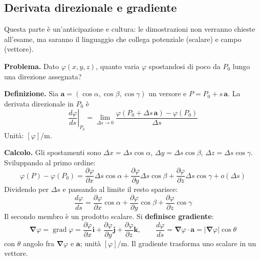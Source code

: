 \documentclass[11pt,a4paper]{article}
\newcommand{\vv}[1]{\mathbf{#1}}
\newcommand{\pd}[2]{\dfrac{\partial #1}{\partial #2}}
\newcommand{\mo}[1]{\left|#1\right|}
\DeclareMathOperator{\grad}{grad}
\newcommand{\nab}{\boldsymbol{\nabla}}
\begin{document}
\subsection{Derivata direzionale e gradiente}\label{sec:derdir}
\begin{nota}
Questa parte è un'anticipazione e \guillemotleft cultura\guillemotright: le dimostrazioni non verranno chieste all'esame, ma saranno il linguaggio che collega potenziale (scalare) e campo (vettore).
\end{nota}

\textbf{Problema.} Dato $\varphi(x,y,z)$, quanto varia $\varphi$ spostandosi di poco da $P_0$ lungo una direzione assegnata?

\textbf{Definizione.} Sia $\vv a=(\cos\alpha,\cos\beta,\cos\gamma)$ un versore e $P=P_0+s\,\vv a$. La derivata direzionale in $P_0$ è
\begin{equation}
\left.\frac{d\varphi}{ds}\right|_{P_0}=\lim_{\Delta s\to0}\frac{\varphi(P_0+\Delta s\,\vv a)-\varphi(P_0)}{\Delta s}
\end{equation}
Unità: $[\varphi]/\mathrm{m}$.

\textbf{Calcolo.} Gli spostamenti sono $\Delta x=\Delta s\cos\alpha$, $\Delta y=\Delta s\cos\beta$, $\Delta z=\Delta s\cos\gamma$. Sviluppando al primo ordine:
\begin{equation}
\varphi(P)-\varphi(P_0)=\pd\varphi x\Delta s\cos\alpha+\pd\varphi y\Delta s\cos\beta+\pd\varphi z\Delta s\cos\gamma+o(\Delta s)
\end{equation}
Dividendo per $\Delta s$ e passando al limite il resto sparisce:
\begin{equation}
\frac{d\varphi}{ds}=\pd\varphi x\cos\alpha+\pd\varphi y\cos\beta+\pd\varphi z\cos\gamma
\end{equation}
Il secondo membro è un prodotto scalare. Si \textbf{definisce gradiente}:
\begin{equation}
\nab\varphi=\grad\varphi=\pd\varphi x\vv i+\pd\varphi y\vv j+\pd\varphi z\vv k,\qquad\frac{d\varphi}{ds}=\nab\varphi\cdot\vv a=\mo{\nab\varphi}\cos\theta
\end{equation}
con $\theta$ angolo fra $\nab\varphi$ e $\vv a$; unità $[\varphi]/\mathrm{m}$. Il gradiente trasforma uno scalare in un vettore.
\end{document}
